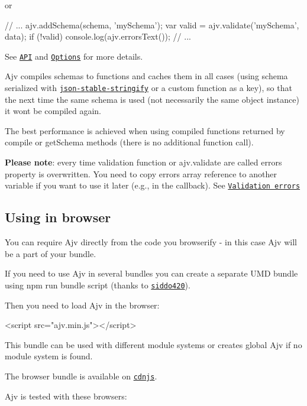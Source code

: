 or


\begin{DoxyCode}
// ...
ajv.addSchema(schema, 'mySchema');
var valid = ajv.validate('mySchema', data);
if (!valid) console.log(ajv.errorsText());
// ...
\end{DoxyCode}


See \href{#api}{\tt A\+PI} and \href{#options}{\tt Options} for more details.

Ajv compiles schemas to functions and caches them in all cases (using schema serialized with \href{https://github.com/substack/json-stable-stringify}{\tt json-\/stable-\/stringify} or a custom function as a key), so that the next time the same schema is used (not necessarily the same object instance) it won\textquotesingle{}t be compiled again.

The best performance is achieved when using compiled functions returned by {\ttfamily compile} or {\ttfamily get\+Schema} methods (there is no additional function call).

{\bfseries Please note}\+: every time validation function or {\ttfamily ajv.\+validate} are called {\ttfamily errors} property is overwritten. You need to copy {\ttfamily errors} array reference to another variable if you want to use it later (e.\+g., in the callback). See \href{#validation-errors}{\tt Validation errors}

\subsection*{Using in browser}

You can require Ajv directly from the code you browserify -\/ in this case Ajv will be a part of your bundle.

If you need to use Ajv in several bundles you can create a separate U\+MD bundle using {\ttfamily npm run bundle} script (thanks to \href{https://github.com/siddo420}{\tt siddo420}).

Then you need to load Ajv in the browser\+: 
\begin{DoxyCode}
<script src="ajv.min.js"></script>
\end{DoxyCode}


This bundle can be used with different module systems or creates global {\ttfamily Ajv} if no module system is found.

The browser bundle is available on \href{https://cdnjs.com/libraries/ajv}{\tt cdnjs}.

Ajv is tested with these browsers\+:

